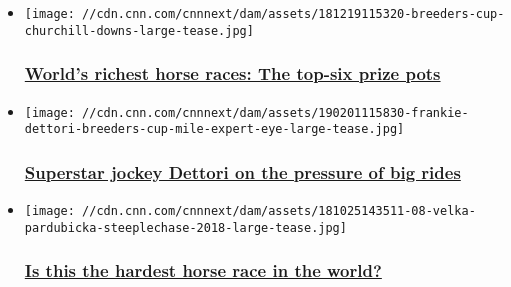\begin{itemize}
\item
  \href{/2018/12/19/sport/winning-post-breeders-cup-dubai-world-cup-pegasus-japan-cup-prix-de-larc-de-triomphe-spt-intl/index.html}{}

  \texttt{[image: //cdn.cnn.com/cnnnext/dam/assets/181219115320-breeders-cup-churchill-downs-large-tease.jpg]}

  \hypertarget{worlds-richest-horse-races-the-top-six-prize-pots}{%
  \subsubsection{\texorpdfstring{\href{/2018/12/19/sport/winning-post-breeders-cup-dubai-world-cup-pegasus-japan-cup-prix-de-larc-de-triomphe-spt-intl/index.html}{World's
  richest horse races: The top-six prize
  pots}}{World's richest horse races: The top-six prize pots}}\label{worlds-richest-horse-races-the-top-six-prize-pots}}
\end{itemize}

\begin{itemize}
\item
  \href{/2019/02/05/sport/frankie-dettori-enable-cracksman-longines-winning-post-spt-intl/index.html}{}

  \texttt{[image: //cdn.cnn.com/cnnnext/dam/assets/190201115830-frankie-dettori-breeders-cup-mile-expert-eye-large-tease.jpg]}

  \hypertarget{superstar-jockey-dettori-on-the-pressure-of-big-rides}{%
  \subsubsection{\texorpdfstring{\href{/2019/02/05/sport/frankie-dettori-enable-cracksman-longines-winning-post-spt-intl/index.html}{Superstar
  jockey Dettori on the pressure of big
  rides}}{Superstar jockey Dettori on the pressure of big rides}}\label{superstar-jockey-dettori-on-the-pressure-of-big-rides}}
\end{itemize}

\begin{itemize}
\item
  \href{/2018/10/31/sport/velka-pardubicka-steeplechase-hardest-horse-race-spt-intl/index.html}{}

  \texttt{[image: //cdn.cnn.com/cnnnext/dam/assets/181025143511-08-velka-pardubicka-steeplechase-2018-large-tease.jpg]}

  \hypertarget{is-this-the-hardest-horse-race-in-the-world}{%
  \subsubsection{\texorpdfstring{\href{/2018/10/31/sport/velka-pardubicka-steeplechase-hardest-horse-race-spt-intl/index.html}{Is
  this the hardest horse race in the
  world?}}{Is this the hardest horse race in the world?}}\label{is-this-the-hardest-horse-race-in-the-world}}
\end{itemize}

